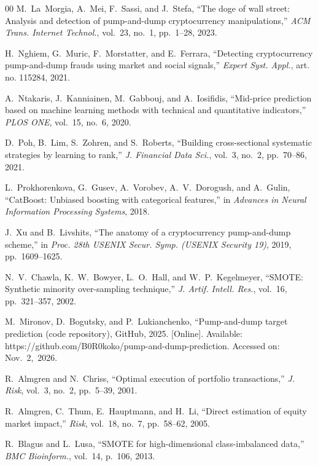 \documentclass{ieeeaccess}
\begin{document}
\begin{thebibliography}{00}
 M.~La~Morgia, A.~Mei, F.~Sassi, and J.~Stefa, ``The doge of wall street: Analysis and detection of pump-and-dump cryptocurrency manipulations,'' \emph{ACM Trans. Internet Technol.}, vol.~23, no.~1, pp.~1--28, 2023.

 H.~Nghiem, G.~Muric, F.~Morstatter, and E.~Ferrara, ``Detecting cryptocurrency pump-and-dump frauds using market and social signals,'' \emph{Expert Syst. Appl.}, art. no. 115284, 2021.

 A.~Ntakaris, J.~Kanniainen, M.~Gabbouj, and A.~Iosifidis, ``Mid-price prediction based on machine learning methods with technical and quantitative indicators,'' \emph{PLOS ONE}, vol.~15, no.~6, 2020.

 D.~Poh, B.~Lim, S.~Zohren, and S.~Roberts, ``Building cross-sectional systematic strategies by learning to rank,'' \emph{J. Financial Data Sci.}, vol.~3, no.~2, pp.~70--86, 2021.

 L.~Prokhorenkova, G.~Gusev, A.~Vorobev, A.~V.~Dorogush, and A.~Gulin, ``CatBoost: Unbiased boosting with categorical features,'' in \emph{Advances in Neural Information Processing Systems}, 2018.

 J.~Xu and B.~Livshits, ``The anatomy of a cryptocurrency pump-and-dump scheme,'' in \emph{Proc. 28th USENIX Secur. Symp. (USENIX Security 19)}, 2019, pp.~1609--1625.

 N.~V.~Chawla, K.~W.~Bowyer, L.~O.~Hall, and W.~P.~Kegelmeyer, ``SMOTE: Synthetic minority over-sampling technique,'' \emph{J. Artif. Intell. Res.}, vol.~16, pp.~321--357, 2002.

M.~Mironov, D.~Bogutsky, and P.~Lukianchenko, ``Pump-and-dump target prediction (code repository), GitHub, 2025. [Online]. Available: https://github.com/B0R0koko/pump-and-dump-prediction. Accessed on: Nov.~2,~2026.


 R.~Almgren and N.~Chriss, ``Optimal execution of portfolio transactions,'' \emph{J. Risk}, vol.~3, no.~2, pp.~5--39, 2001.

 R.~Almgren, C.~Thum, E.~Hauptmann, and H.~Li, ``Direct estimation of equity market impact,'' \emph{Risk}, vol.~18, no.~7, pp.~58--62, 2005.

 R.~Blagus and L.~Lusa, ``SMOTE for high-dimensional class-imbalanced data,'' \emph{BMC Bioinform.}, vol.~14, p.~106, 2013.


\end{thebibliography}
\end{document}
